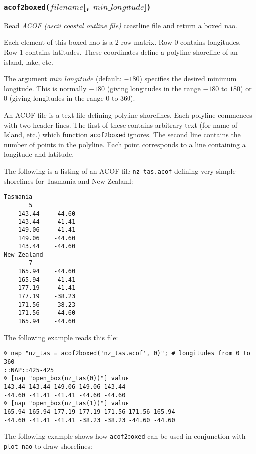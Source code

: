 \subsubsection{\texttt{acof2boxed(}$\mathit{filename}$[\texttt{,}
$\mathit{min\_longitude}$]\texttt{)}}
    \label{geog-acof2boxed}

Read \emph{ACOF (ascii coastal outline file)} coastline file and return a boxed nao.

Each element of this boxed nao is a 2-row matrix.
Row 0 contains longitudes.
Row 1 contains latitudes.
These coordinates define a polyline shoreline of an island, lake, etc.

The argument 
$\mathit{min\_longitude}$
(default: $-180$) specifies the desired minimum longitude.
This is normally $-180$ (giving longitudes in the range $-180$ to $180$)
or $0$ (giving longitudes in the range $0$ to $360$).

An ACOF file is a text file defining polyline shorelines.
Each polyline commences with two header lines.
The first of these contains arbitrary text (for name of Island, etc.)
which function \texttt{acof2boxed} ignores.
The second line contains the number of points in the polyline.
Each point corresponds to a line containing a longitude and latitude.

The following is a listing of an ACOF file
\texttt{nz\_tas.acof} defining very simple shorelines for Tasmania and New Zealand:

\begin{verbatim}
Tasmania
       5
    143.44    -44.60
    143.44    -41.41
    149.06    -41.41
    149.06    -44.60
    143.44    -44.60
New Zealand
       7
    165.94    -44.60
    165.94    -41.41
    177.19    -41.41
    177.19    -38.23
    171.56    -38.23
    171.56    -44.60
    165.94    -44.60
\end{verbatim}

The following example reads this file:

\begin{verbatim}
% nap "nz_tas = acof2boxed('nz_tas.acof', 0)"; # longitudes from 0 to 360
::NAP::425-425
% [nap "open_box(nz_tas(0))"] value
143.44 143.44 149.06 149.06 143.44
-44.60 -41.41 -41.41 -44.60 -44.60
% [nap "open_box(nz_tas(1))"] value
165.94 165.94 177.19 177.19 171.56 171.56 165.94
-44.60 -41.41 -41.41 -38.23 -38.23 -44.60 -44.60
\end{verbatim}

The following example shows how \texttt{acof2boxed}
can be used in conjunction with \texttt{plot\_nao} to draw shorelines:

